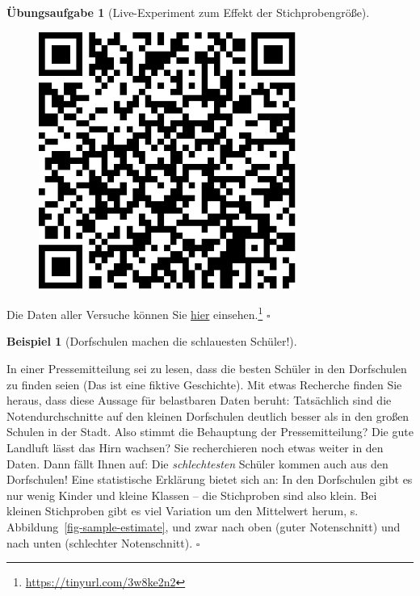 \documentclass[
  a4paper,
]{scrbook}
\theoremstyle{definition}
\newtheorem{example}{Beispiel}[chapter]
\theoremstyle{definition}
\theoremstyle{definition}
\newtheorem{exercise}{Übungsaufgabe}[chapter]
\theoremstyle{remark}
\begin{document}
\begin{exercise}[Live-Experiment zum Effekt der
Stichprobengröße]
\begin{figure}
\begin{minipage}{0.20\linewidth}
\begin{center}
\includegraphics[width=0.75\textwidth,height=\textheight]{010-rahmen_files/figure-pdf/unnamed-chunk-16-1.pdf}
\end{center}

\end{minipage}%

\end{figure}%

Die Daten aller Versuche können Sie
\href{https://docs.google.com/spreadsheets/d/11mKFFpr-Y1CMPpq4dGA-JA_Z9jRkPbXolo54Y0G_2gE/edit?usp=sharing}{hier}
einsehen.\footnote{\url{https://tinyurl.com/3w8ke2n2}} \(\square\)

\end{exercise}

\begin{example}[Dorfschulen machen die schlauesten
Schüler!]\protect\hypertarget{exm-schule-samplesize}{}\label{exm-schule-samplesize}

In einer Pressemitteilung sei zu lesen, dass die besten Schüler in den
Dorfschulen zu finden seien (Das ist eine fiktive Geschichte). Mit etwas
Recherche finden Sie heraus, dass diese Aussage für belastbaren Daten
beruht: Tatsächlich sind die Notendurchschnitte auf den kleinen
Dorfschulen deutlich besser als in den großen Schulen in der Stadt. Also
stimmt die Behauptung der Pressemitteilung? Die gute Landluft lässt das
Hirn wachsen? Sie recherchieren noch etwas weiter in den Daten. Dann
fällt Ihnen auf: Die \emph{schlechtesten} Schüler kommen auch aus den
Dorfschulen! Eine statistische Erklärung bietet sich an: In den
Dorfschulen gibt es nur wenig Kinder und kleine Klassen -- die
Stichproben sind also klein. Bei kleinen Stichproben gibt es viel
Variation um den Mittelwert herum, s.
Abbildung~\ref{fig-sample-estimate}, und zwar nach oben (guter
Notenschnitt) und nach unten (schlechter Notenschnitt). \(\square\)

\end{example}
\end{document}
